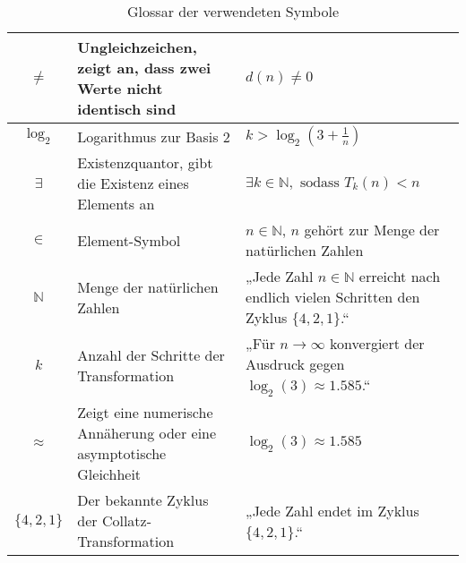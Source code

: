 \documentclass[a4paper,12pt]{article}
\begin{document}
\begin{table}[h!]
\begin{tabular}{|c|p{7cm}|p{5cm}|}
    \( \neq \) & Ungleichzeichen, zeigt an, dass zwei Werte nicht identisch sind & \( d(n) \neq 0 \) \\ \hline
    \( \log_2 \) & Logarithmus zur Basis 2 & \( k > \log_2(3 + \frac{1}{n}) \) \\ \hline
    \( \exists \) & Existenzquantor, gibt die Existenz eines Elements an & \( \exists k \in \mathbb{N}, \text{ sodass } T_k(n) < n \) \\ \hline
    \( \in \) & Element-Symbol & \( n \in \mathbb{N} \), \( n \) gehört zur Menge der natürlichen Zahlen \\ \hline
    \( \mathbb{N} \) & Menge der natürlichen Zahlen & „Jede Zahl \( n \in \mathbb{N} \) erreicht nach endlich vielen Schritten den Zyklus \( \{4, 2, 1\} \).“ \\ \hline
    \( k \) & Anzahl der Schritte der Transformation & „Für \( n \to \infty \) konvergiert der Ausdruck gegen \( \log_2(3) \approx 1.585 \).“ \\ \hline
    \( \approx \) & Zeigt eine numerische Annäherung oder eine asymptotische Gleichheit & \( \log_2(3) \approx 1.585 \) \\ \hline
    \( \{4, 2, 1\} \) & Der bekannte Zyklus der Collatz-Transformation & „Jede Zahl endet im Zyklus \( \{4, 2, 1\} \).“ \\ \hline
    \end{tabular}
    \caption{Glossar der verwendeten Symbole}
    \label{tab:glossar}
\end{table}
\end{document}
